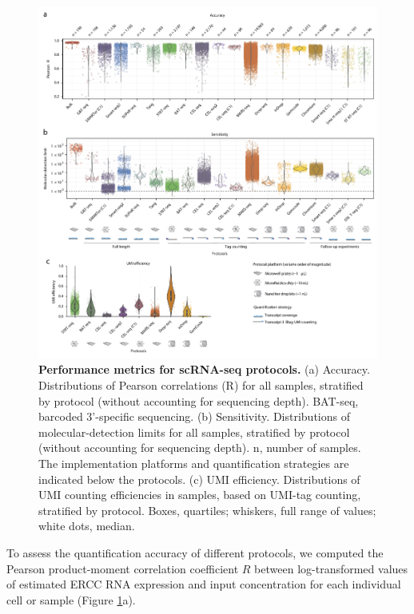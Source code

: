 \begin{figure}
    \centering
    \centerline{\includegraphics[width=0.75\paperwidth]{"Figure 2"}}
    \caption[Performance metrics for scRNA-seq protocols]{\textbf{Performance metrics for scRNA-seq protocols.} (a) Accuracy. Distributions of Pearson correlations (R) for all samples, stratified by protocol (without accounting for sequencing depth). BAT-seq, barcoded 3'-specific sequencing. (b) Sensitivity. Distributions of molecular-detection limits for all samples, stratified by protocol (without accounting for sequencing depth). n, number of samples. The implementation platforms and quantification strategies are indicated below the protocols. (c) UMI efficiency. Distributions of UMI counting efficiencies in samples, based on UMI-tag counting, stratified by protocol. Boxes, quartiles; whiskers, full range of values; white dots, median.}
    \label{fig:performance}
\end{figure}

To assess the quantification accuracy of different protocols, we computed the Pearson product-moment correlation coefficient \( R \) between log-transformed values of estimated ERCC RNA expression and input concentration for each individual cell or sample (Figure \ref{fig:performance}a).

